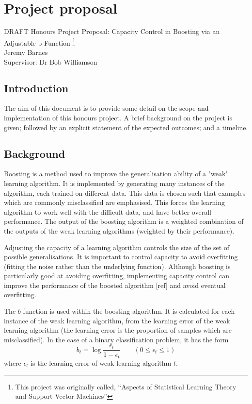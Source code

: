 \chapter{Project proposal}
\label{chapter:proposal}

\begin{center}
{\Large DRAFT Honours Project Proposal:
Capacity Control in Boosting via an Adjustable  b Function
\footnote{This project was originally called, ``Aspects
of Statistical Learning Theory and Support Vector Machines''} \\
Jeremy Barnes \\
Supervisor: Dr Bob Williamson}
\end{center}

\section{Introduction}
The aim of this document is to provide some detail on the scope and
implementation of this honours project.  A brief background on the
project is given; followed by an explicit statement of the expected
outcomes; and a timeline.

\section{Background}
Boosting is a method used to improve the generalisation ability of a
"weak" learning algorithm.  It is implemented by generating many
instances of the algorithm, each trained on different data.  This data
is chosen such that examples which are commonly misclassified are
emphasised.  This forces the learning algorithm to work well with the
difficult data, and have better overall performance.  The output of
the boosting algorithm is a weighted combination of the outputs of the
weak learning algorithms (weighted by their performance).

Adjusting the capacity of a learning algorithm controls the size of
the set of possible generalisations.  It is important to control
capacity to avoid overfitting (fitting the noise rather than the
underlying function).  Although boosting is particularly good at
avoiding overfitting, implementing capacity control can improve the
performance of the boosted algorithm [ref] and avoid eventual
overfitting.

The $b$ function is used within the boosting algorithm.  It is
calculated for each instance of the weak learning algorithm, from the
learning error of the weak learning algorithm (the learning error is
the proportion of samples which are misclassified).  In the case of a
binary classification problem, it has the form
%
\begin{equation}
b_t = \log \frac{\epsilon_t}{1-\epsilon_t} \qquad (0 \leq \epsilon_t
\leq 1)
\end{equation}
%	
where $\epsilon_t$ is the learning error of weak learning algorithm  $t$.

